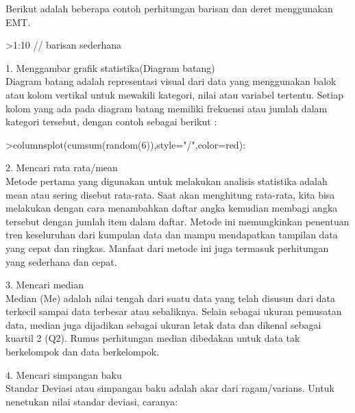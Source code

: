 \documentclass[a4paper,10pt]{article}
\begin{document}
\begin{eulernotebook}
\begin{eulercomment}
\begin{eulercomment}
\begin{eulercomment}
\begin{eulercomment}
\begin{eulercomment}
Berikut adalah beberapa contoh perhitungan barisan dan deret
menggunakan EMT.
\end{eulercomment}
\begin{eulerprompt}
>1:10 // barisan sederhana
\end{eulerprompt}
\begin{euleroutput}
  [1,  2,  3,  4,  5,  6,  7,  8,  9,  10]
\end{euleroutput}
\begin{eulercomment}
\begin{eulercomment}
\begin{eulercomment}
1. Menggambar grafik statistika(Diagram batang)\\
Diagram batang adalah representasi visual dari data yang menggunakan
balok atau kolom vertikal untuk mewakili kategori, nilai atau variabel
tertentu. Setiap kolom yang ada pada diagram  batang memiliki
frekuensi atau jumlah dalam kategori tersebut, dengan contoh sebagai
berikut :
\end{eulercomment}
\begin{eulerprompt}
>columnsplot(cumsum(random(6)),style="/",color=red):
\end{eulerprompt}
\begin{eulercomment}
2. Mencari rata rata/mean\\
Metode pertama yang digunakan untuk melakukan analisis statistika
adalah mean atau sering disebut rata-rata. Saat akan menghitung
rata-rata, kita bisa melakukan dengan cara menambahkan daftar angka
kemudian membagi angka tersebut dengan jumlah item dalam daftar.
Metode ini memungkinkan penentuan tren keseluruhan dari kumpulan data
dan mampu mendapatkan tampilan data yang cepat dan ringkas. Manfaat
dari metode ini juga termasuk perhitungan yang sederhana dan cepat.

3. Mencari median\\
Median (Me) adalah nilai tengah dari suatu data yang telah disusun
dari data terkecil sampai data terbesar atau sebaliknya. Selain
sebagai ukuran pemusatan data, median juga dijadikan sebagai ukuran
letak data dan dikenal sebagai kuartil 2 (Q2). Rumus perhitungan
median dibedakan untuk data tak berkelompok dan data berkelompok.

4. Mencari simpangan baku\\
Standar Deviasi atau simpangan baku adalah akar dari ragam/varians.
Untuk nenetukan nilai standar deviasi, caranya:


\end{eulercomment}
\end{eulercomment}
\end{eulercomment}
\end{eulercomment}
\end{eulercomment}
\end{eulercomment}
\end{eulercomment}
\end{eulernotebook}
\end{document}
